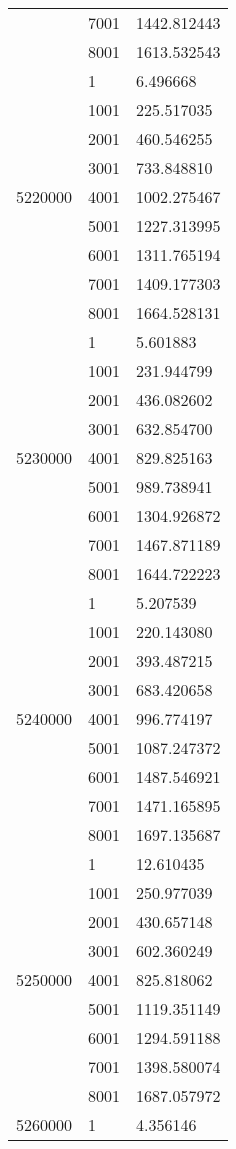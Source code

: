 \begin{table}[htb!]
\begin{tabular}{lll}
 & 7001 & 1442.812443 \\
 & 8001 & 1613.532543 \\
\multirow[c]{9}{*}{5220000} & 1 & 6.496668 \\
 & 1001 & 225.517035 \\
 & 2001 & 460.546255 \\
 & 3001 & 733.848810 \\
 & 4001 & 1002.275467 \\
 & 5001 & 1227.313995 \\
 & 6001 & 1311.765194 \\
 & 7001 & 1409.177303 \\
 & 8001 & 1664.528131 \\
\multirow[c]{9}{*}{5230000} & 1 & 5.601883 \\
 & 1001 & 231.944799 \\
 & 2001 & 436.082602 \\
 & 3001 & 632.854700 \\
 & 4001 & 829.825163 \\
 & 5001 & 989.738941 \\
 & 6001 & 1304.926872 \\
 & 7001 & 1467.871189 \\
 & 8001 & 1644.722223 \\
\multirow[c]{9}{*}{5240000} & 1 & 5.207539 \\
 & 1001 & 220.143080 \\
 & 2001 & 393.487215 \\
 & 3001 & 683.420658 \\
 & 4001 & 996.774197 \\
 & 5001 & 1087.247372 \\
 & 6001 & 1487.546921 \\
 & 7001 & 1471.165895 \\
 & 8001 & 1697.135687 \\
\multirow[c]{9}{*}{5250000} & 1 & 12.610435 \\
 & 1001 & 250.977039 \\
 & 2001 & 430.657148 \\
 & 3001 & 602.360249 \\
 & 4001 & 825.818062 \\
 & 5001 & 1119.351149 \\
 & 6001 & 1294.591188 \\
 & 7001 & 1398.580074 \\
 & 8001 & 1687.057972 \\
\multirow[c]{9}{*}{5260000} & 1 & 4.356146 \\

\end{tabular}
\end{table}
